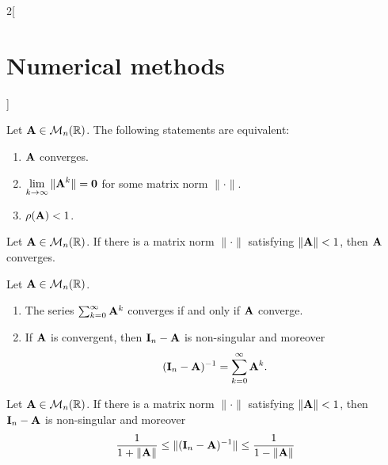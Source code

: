 \documentclass[../../../main.tex]{subfiles}
\begin{document}
\begin{multicols}{2}[\section{Numerical methods}]
\begin{theorem}
    Let $\vb{A}\in\mathcal{M}_n(\mathbb{R})$. The following statements are equivalent:
    \begin{enumerate}
        \item $\vb{A}$ converges.
        \item $\displaystyle\lim_{k\to\infty}\|\vb{A}^k\|=\vb{0}$ for some matrix norm $\|\cdot\|$.
        \item $\rho(\vb{A})<1$.
    \end{enumerate}
\end{theorem}
\begin{corollary}
    Let $\vb{A}\in\mathcal{M}_n(\mathbb{R})$. If there is a matrix norm $\|\cdot\|$ satisfying $\|\vb{A}\|<1$, then $\vb{A}$ converges.
\end{corollary}
\begin{theorem}
    Let $\vb{A}\in\mathcal{M}_n(\mathbb{R})$.
    \begin{enumerate}
        \item The series $\sum_{k=0}^\infty \vb{A}^k$ converges if and only if $\vb{A}$ converge.
        \item If $\vb{A}$ is convergent, then $\vb{I}_n-\vb{A}$ is non-singular and moreover $$(\vb{I}_n-\vb{A})^{-1}=\sum_{k=0}^\infty\vb{A}^k.$$
    \end{enumerate}
\end{theorem}
\begin{corollary}
    Let $\vb{A}\in\mathcal{M}_n(\mathbb{R})$. If there is a matrix norm $\|\cdot\|$ satisfying $\|\vb{A}\|<1$, then $\vb{I}_n-\vb{A}$ is non-singular and moreover $$\frac{1}{1+\|\vb{A}\|}\leq\|(\vb{I}_n-\vb{A})^{-1}\|\leq\frac{1}{1-\|\vb{A}\|}$$
\end{corollary}

\end{multicols}
\end{document}
